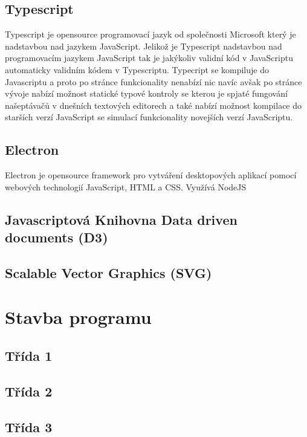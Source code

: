 \documentclass[
  biblatex,
  glossaries,
  index
]{kidiplom}
\begin{document}
\subsection{Typescript}
Typescript je opensource programovací jazyk od společnosti Microsoft který je nadstavbou nad jazykem JavaScript.
Jelikož je Typescript nadstavbou nad programovacím jazykem JavaScript tak je jakýkoliv validní kód v JavaScriptu automaticky validním kódem v Typescriptu.
Typecript se kompiluje do Javascriptu a proto po stránce funkcionality nenabízí nic navíc avšak po stránce vývoje nabízí možnost statické typové kontroly
se kterou je spjaté fungování našeptávačů v dnešních textových editorech a také nabízí možnost kompilace do starších verzí JavaScript se simulací funkcionality novejších verzí JavaScriptu.


\subsection{Electron}
Electron je opensource framework pro vytváření desktopových aplikací pomocí webových technologií JavaScript, HTML a CSS.
Využívá NodeJS


\subsection{Javascriptová Knihovna Data driven documents (D3)}

\subsection{Scalable Vector Graphics (SVG)}




\section{Stavba programu}

\subsection{Třída 1}
\subsection{Třída 2}
\subsection{Třída 3}
\end{document}
